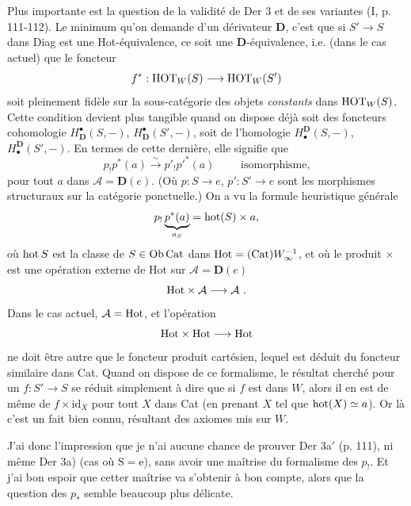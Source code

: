 Plus importante est la question de la validité de Der 3 et de ses variantes (I, p. 111-112). Le minimum qu'on demande d'un dérivateur $\mathbf{D}$, c'est que si $S'\longrightarrow S$ dans Diag est une Hot-équivalence, ce soit une $\mathbf{D}$-équivalence, i.e. (dans le cas actuel) que le foncteur
\[ f^* : \mathrm{HOT}_W(S) \longrightarrow \mathrm{HOT}_W(S') \]
soit pleinement fidèle sur la sous-catégorie des objets \textit{constants} dans $\mathrm{HOT}_W(S)$. Cette condition devient plus tangible quand on dispose déjà soit des foncteurs cohomologie $H^\bullet_{\mathbf{D}}(S,-)$, $H^\bullet_{\mathbf{D}}(S',-)$, soit de l'homologie $H_\bullet^{\mathbf{D}}(S,-)$, $H_\bullet^{\mathbf{D}}(S',-)$. En termes de cette dernière, elle signifie que
\[ p_!p^*(a) \xrightarrow{\sim} p'_!p'^*(a) \qquad \text{ isomorphisme,} \]
pour tout $a$ dans $\mathcal{A}=\mathbf{D}(e)$. (Où $p:S\longrightarrow e$, $p':S'\longrightarrow e$ sont les morphismes structuraux sur la catégorie ponctuelle.) On a vu la formule heuristique générale
\[ p_!\underbrace{p^*(a)}_{a_S} = \mathrm{hot}(S)\times a, \]
où $\mathrm{hot}\,S$ est la classe de $S\in\mathrm{Ob}\,\mathrm{Cat}$ dans $\mathrm{Hot}=(\mathrm{Cat})W_\infty^{-1}$, et où le produit $\times$ est une opération externe de Hot sur $\mathcal{A}=\mathbf{D}(e)$
\[ \mathrm{Hot}\times\mathcal{A} \longrightarrow \mathcal{A}\ . \]
Dans le cas actuel, $\mathcal{A}=\mathrm{Hot}$, et l'opération
\[ \mathrm{Hot}\times\mathrm{Hot} \longrightarrow \mathrm{Hot} \]
ne doit être autre que le foncteur produit cartésien, lequel est déduit du foncteur similaire dans Cat. Quand on dispose de ce formalisme, le résultat cherché pour un $f:S'\longrightarrow S$ se réduit simplement à dire que si $f$ est dans $W$, alors il en est de même de $f\times\mathrm{id}_X$ pour tout $X$ dans Cat (en prenant $X$ tel que $\mathrm{hot}(X)\simeq a$). Or là c'est un fait bien connu, résultant des axiomes mis sur $W$.

J'ai donc l'impression que je n'ai aucune chance de prouver Der 3a$'$ (p. 111), ni même Der 3a) (cas où $\mathrm{S}=\mathrm{e}$), sans avoir une maîtrise du formalisme des $p_!$. Et j'ai
bon espoir que cetter maîtrise va s'obtenir à bon compte, alors que la question des $p_*$ semble beaucoup plus délicate. %

